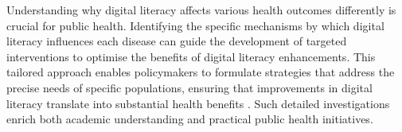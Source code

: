 Understanding why digital literacy affects various health outcomes differently is crucial for public health. Identifying the specific mechanisms by which digital literacy influences each disease can guide the development of targeted interventions to optimise the benefits of digital literacy enhancements. This tailored approach enables policymakers to formulate strategies that address the precise needs of specific populations, ensuring that improvements in digital literacy translate into substantial health benefits \parencite{harris_biosocial_2018}. Such detailed investigations enrich both academic understanding and practical public health initiatives.
